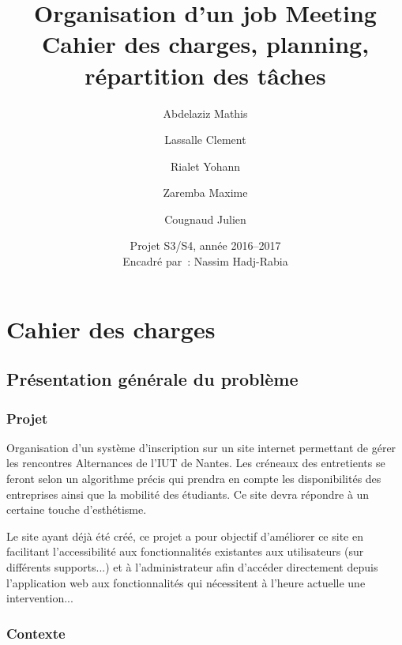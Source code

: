 \documentclass[a4paper]{article}
\title{%
  Organisation d'un job Meeting %
  \\ \Large Cahier des charges, planning, répartition des tâches%
}
\author{Abdelaziz Mathis \and Lassalle Clement \and Rialet Yohann \and Zaremba Maxime \and Cougnaud Julien} %
\date{%
  Projet S3/S4, année 2016--2017 \\
  Encadré par~:
  Nassim Hadj-Rabia %
}
\begin{document}
\maketitle

\section{Cahier des charges}

\subsection{Présentation générale du problème}

\subsubsection{Projet}


Organisation d'un système d'inscription sur un site internet permettant de gérer les rencontres Alternances de l'IUT de Nantes. Les créneaux des entretients se feront selon un algorithme précis qui prendra en compte les disponibilités des entreprises ainsi que la mobilité des étudiants. Ce site devra répondre à un certaine touche d'esthétisme.

Le site ayant déjà été créé, ce projet a pour objectif d'améliorer ce site en facilitant l'accessibilité aux fonctionnalités existantes aux utilisateurs (sur différents supports...) et à l'administrateur afin d'accéder directement depuis l'application web aux fonctionnalités qui nécessitent à l'heure actuelle une intervention...

\subsubsection{Contexte}

\end{document}

